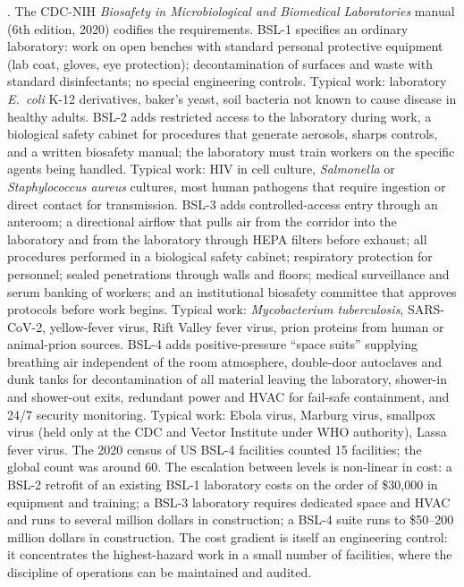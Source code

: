 . The CDC-NIH
\emph{Biosafety in Microbiological and Biomedical Laboratories}
manual (6th edition, 2020)\cite[\S\,II]{web:v6c09-cdc-bmbl-6-2020}
codifies the requirements. BSL-1 specifies an ordinary laboratory:
work on open benches with standard personal protective equipment
(lab coat, gloves, eye protection); decontamination of surfaces and
waste with standard disinfectants; no special engineering controls.
Typical work: laboratory \emph{E.\ coli} K-12 derivatives, baker's
yeast, soil bacteria not known to cause disease in healthy adults.
BSL-2 adds restricted access to the laboratory during work, a
biological safety cabinet for procedures that generate aerosols,
sharps controls, and a written biosafety manual; the laboratory
must train workers on the specific agents being handled. Typical
work: HIV in cell culture, \emph{Salmonella} or
\emph{Staphylococcus aureus} cultures, most human pathogens that
require ingestion or direct contact for transmission. BSL-3 adds
controlled-access entry through an anteroom; a directional airflow
that pulls air from the corridor into the laboratory and from the
laboratory through HEPA filters before exhaust; all procedures
performed in a biological safety cabinet; respiratory protection
for personnel; sealed penetrations through walls and floors;
medical surveillance and serum banking of workers; and an
institutional biosafety committee that approves protocols before
work begins. Typical work: \emph{Mycobacterium tuberculosis},
SARS-CoV-2, yellow-fever virus, Rift Valley fever virus, prion
proteins from human or animal-prion sources. BSL-4 adds positive-pressure
``space suits'' supplying breathing air independent of the room
atmosphere, double-door autoclaves and dunk tanks for
decontamination of all material leaving the laboratory, shower-in
and shower-out exits, redundant power and HVAC for fail-safe
containment, and 24/7 security monitoring. Typical work: Ebola
virus, Marburg virus, smallpox virus (held only at the CDC and
Vector Institute under WHO authority), Lassa fever virus. The
2020 census of US BSL-4 facilities counted 15 facilities; the
global count was around 60. The escalation between levels is
non-linear in cost: a BSL-2 retrofit of an existing BSL-1
laboratory costs on the order of \$30{,}000 in equipment and
training; a BSL-3 laboratory requires dedicated space and HVAC
and runs to several million dollars in construction; a BSL-4
suite runs to \$50--200 million dollars in construction. The cost
gradient is itself an engineering control: it concentrates the
highest-hazard work in a small number of facilities, where the
discipline of operations can be maintained and audited.

